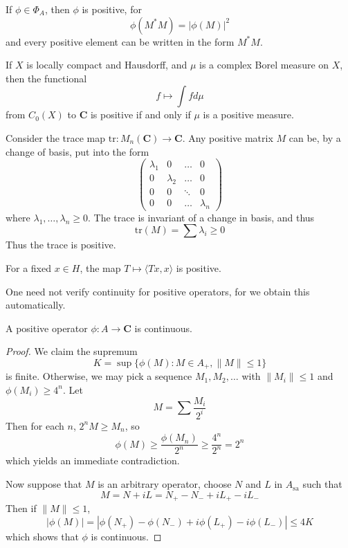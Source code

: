 \begin{example}
    If $\phi \in \Phi_A$, then $\phi$ is positive, for
    \[ \phi(M^*M) = |\phi(M)|^2 \]
    and every positive element can be written in the form $M^*M$.
\end{example}

\begin{example}
    If $X$ is locally compact and Hausdorff, and $\mu$ is a complex Borel measure on $X$, then the functional
    \[ f \mapsto \int f d\mu \]
    from $C_0(X)$ to $\mathbf{C}$ is positive if and only if $\mu$ is a positive measure.
\end{example}

\begin{example}
    Consider the trace map $\text{tr}: M_n(\mathbf{C}) \to \mathbf{C}$. Any positive matrix $M$ can be, by a change of basis, put into the form
    \[ \begin{pmatrix} \lambda_1 & 0 & \dots & 0 \\ 0 & \lambda_2 & \dots & 0 \\ 0 & 0 & \ddots & 0 \\ 0 & 0 & \dots & \lambda_n \end{pmatrix} \]
    where $\lambda_1, \dots, \lambda_n \geq 0$. The trace is invariant of a change in basis, and thus
    \[ \text{tr}(M) = \sum \lambda_i \geq 0 \]
    Thus the trace is positive.
\end{example}

\begin{example}
    For a fixed $x \in H$, the map $T \mapsto \langle Tx, x \rangle$ is positive.
\end{example}

One need not verify continuity for positive operators, for we obtain this automatically.

\begin{prop}
    A positive operator $\phi:A \to \mathbf{C}$ is continuous.
\end{prop}
\begin{proof}
    We claim the supremum
    \[ K = \sup \{ \phi(M): M \in A_+, \| M \| \leq 1 \} \]
    is finite. Otherwise, we may pick a sequence $M_1, M_2, \dots$ with $\| M_i \| \leq 1$ and $\phi(M_i) \geq 4^n$. Let
    \[ M = \sum \frac{M_i}{2^i} \]
    Then for each $n$, $2^n M \geq M_n$, so
    \[ \phi(M) \geq \frac{\phi(M_n)}{2^n} \geq \frac{4^n}{2^n} = 2^n \]
    which yields an immediate contradiction.

    Now suppose that $M$ is an arbitrary operator, choose $N$ and $L$ in $A_{\text{sa}}$ such that
    \[ M = N + iL = N_+ - N_- + iL_+ - iL_- \]
    Then if $\| M \| \leq 1$,
    \[ |\phi(M)| = |\phi(N_+) - \phi(N_-) + i\phi(L_+) - i\phi(L_-)| \leq 4K \]
    which shows that $\phi$ is continuous.
\end{proof}

